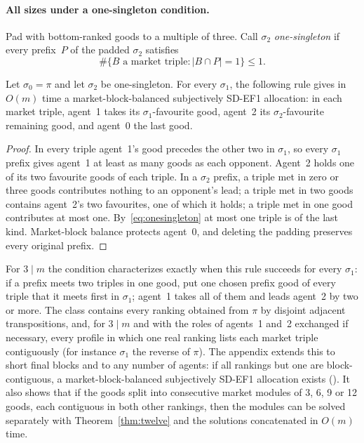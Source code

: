 \documentclass[sigconf,anonymous]{aamas}
\begin{document}
\paragraph{All sizes under a one-singleton condition.}
Pad with bottom-ranked goods to a multiple of three. Call $\sigma_2$ \emph{one-singleton} if every prefix~$P$ of the padded $\sigma_2$ satisfies
\begin{equation}
 \#\{B\text{ a market triple}: |B\cap P|=1\}\le1.\label{eq:onesingleton}
\end{equation}
\begin{theorem}\label{thm:onesingleton}
Let $\sigma_0=\pi$ and let $\sigma_2$ be one-singleton. For every $\sigma_1$, the following rule gives in $O(m)$ time a market-block-balanced subjectively SD-EF1 allocation: in each market triple, agent~1 takes its $\sigma_1$-favourite good, agent~2 its $\sigma_2$-favourite remaining good, and agent~0 the last good.
\end{theorem}
\begin{proof}
In every triple agent~1's good precedes the other two in $\sigma_1$, so every $\sigma_1$ prefix gives agent~1 at least as many goods as each opponent. Agent~2 holds one of its two favourite goods of each triple. In a $\sigma_2$ prefix, a triple met in zero or three goods contributes nothing to an opponent's lead; a triple met in two goods contains agent~2's two favourites, one of which it holds; a triple met in one good contributes at most one. By~\eqref{eq:onesingleton} at most one triple is of the last kind. Market-block balance protects agent~0, and deleting the padding preserves every original prefix.
\end{proof}
For $3\mid m$ the condition characterizes exactly when this rule succeeds for every $\sigma_1$: if a prefix meets two triples in one good, put one chosen prefix good of every triple that it meets first in $\sigma_1$; agent~1 takes all of them and leads agent~2 by two or more. The class contains every ranking obtained from $\pi$ by disjoint adjacent transpositions, and, for $3\mid m$ and with the roles of agents~1 and~2 exchanged if necessary, every profile in which one real ranking lists each market triple contiguously (for instance $\sigma_1$ the reverse of $\pi$). The appendix extends this to short final blocks and to any number of agents: if all rankings but one are block-contiguous, a market-block-balanced subjectively SD-EF1 allocation exists (\appAllsizes). It also shows that if the goods split into consecutive market modules of 3, 6, 9 or 12 goods, each contiguous in both other rankings, then the modules can be solved separately with Theorem~\ref{thm:twelve} and the solutions concatenated in $O(m)$ time.
\end{document}
